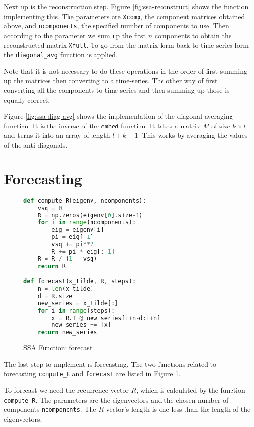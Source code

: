 Next up is the reconstruction step. Figure \ref{fig:ssa-reconstruct} shows the function implementing this. The parameters are \texttt{Xcomp}, the component matrices obtained above, and \texttt{ncomponents}, the specified number of components to use. Then according to the parameter we sum up the first $n$ components to obtain the reconstructed matrix \texttt{Xfull}. To go from the matrix form back to time-series form the \texttt{diagonal\_avg} function is applied. 

Note that it is not necessary to do these operations in the order of first summing up the matrices then converting to a time-series. The other way of first converting all the components to time-series and then summing up those is equally correct. 

Figure \ref{fig:ssa-diag-avg} shows the implementation of the diagonal averaging function. It is the inverse of the \texttt{embed} function. It takes a matrix $M$ of size $k \times l$ and turns it into an array of length $l+k-1$. This works by averaging the values of the anti-diagonals. 

\section{Forecasting}

\begin{figure}
\begin{singlespace}
\begin{lstlisting}[language=Python]
def compute_R(eigenv, ncomponents):
    vsq = 0
    R = np.zeros(eigenv[0].size-1)
    for i in range(ncomponents):
        eig = eigenv[i]
        pi = eig[-1]
        vsq += pi**2
        R += pi * eig[:-1]
    R = R / (1 - vsq)
    return R

def forecast(x_tilde, R, steps):
    n = len(x_tilde)
    d = R.size
    new_series = x_tilde[:]
    for i in range(steps):
        x = R.T @ new_series[i+n-d:i+n]
        new_series += [x]
    return new_series
\end{lstlisting}
\end{singlespace}
\caption{SSA Function: forecast}    
\label{fig:ssa-forecast}
\end{figure}

The last step to implement is forecasting. The two functions related to forecasting \texttt{compute\_R} and \texttt{forecast} are listed in Figure \ref{fig:ssa-forecast}. 

To forecast we need the recurrence vector $R$, which is calculated by the function \texttt{compute\_R}. The parameters are the eigenvectors and the chosen number of components \texttt{ncomponents}. The $R$ vector's length is one less than the length of the eigenvectors. 

